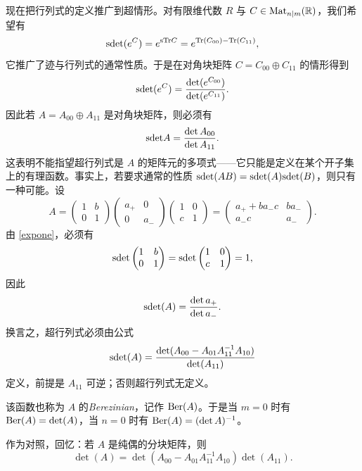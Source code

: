 现在把行列式的定义推广到超情形。对有限维代数 $R$ 与 $C\in {\rm Mat}_{n|m}(\Bbb R)$，我们希望有
\begin{equation}\label{expone}
{\rm sdet}(e^C)=e^{{\rm sTr}C}=e^{{\rm Tr}(C_{00})-{\rm Tr}(C_{11})},
\end{equation}
它推广了迹与行列式的通常性质。于是在对角块矩阵 $C=C_{00}\oplus C_{11}$ 的情形得到
$$
{\rm sdet}(e^C)=\frac{\det(e^{C_{00}})}{\det(e^{C_{11}})}.
$$
因此若 $A=A_{00}\oplus A_{11}$ 是对角块矩阵，则必须有
$$
{\rm sdet}A=\frac{\det A_{00}}{\det A_{11}}.
$$
这表明不能指望超行列式是 $A$ 的矩阵元的多项式——它只能是定义在某个开子集上的有理函数。事实上，若要求通常的性质 ${\rm sdet}(AB)={\rm sdet}(A){\rm sdet}(B)$，则只有一种可能。设
$$
A=\begin{pmatrix} 1 & b\\ 0& 1\end{pmatrix}
\begin{pmatrix} a_+ & 0\\ 0& a_-\end{pmatrix}
\begin{pmatrix} 1 & 0\\ c& 1\end{pmatrix}=\begin{pmatrix} a_++ba_-c & ba_-\\ a_-c& a_-\end{pmatrix}.
$$
由 \eqref{expone}，必须有
$$
{\rm sdet} \begin{pmatrix} 1 & b\\ 0& 1\end{pmatrix}={\rm sdet} \begin{pmatrix} 1 & 0\\ c& 1\end{pmatrix}=1,
$$
因此
$$
{\rm sdet}(A)=\frac{\det a_+}{\det a_-}.
$$
换言之，超行列式必须由公式
$$
{\rm sdet}(A)=\frac{\det(A_{00}-A_{01}A_{11}^{-1}A_{10})}
{\det(A_{11})}
$$
定义，前提是 $A_{11}$ 可逆；否则超行列式无定义。

该函数也称为 $A$ 的\emph{Berezinian}，记作 ${\rm Ber}(A)$。于是当 $m=0$ 时有 ${\rm Ber}(A)=\det(A)$，当 $n=0$ 时有 ${\rm Ber}(A)=(\det A)^{-1}$。

\begin{remark} 作为对照，回忆：若 $A$ 是纯偶的分块矩阵，则
$$
\det(A)=\det(A_{00}-A_{01}A_{11}^{-1}A_{10})\det(A_{11}).
$$
\end{remark}


